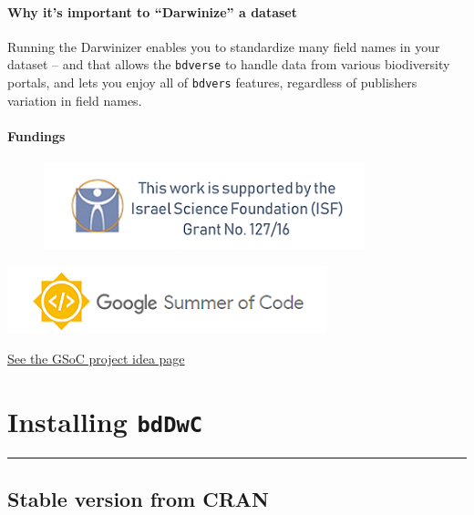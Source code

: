 \documentclass[]{book}
\theoremstyle{definition}
\theoremstyle{definition}
\theoremstyle{definition}
\theoremstyle{remark}
\begin{document}
\subsubsection*{\texorpdfstring{Why it's important to ``Darwinize'' a
dataset}{Why it's important to Darwinize a dataset}}\label{why-its-important-to-darwinize-a-dataset}

Running the Darwinizer enables you to standardize many field names in
your dataset -- and that allows the \texttt{bdverse} to handle data from
various biodiversity portals, and lets you enjoy all of \texttt{bdvers}
features, regardless of publishers variation in field names.

\subsubsection*{Fundings}\label{fundings}

\begin{figure}
\centering
\includegraphics{img/ISF.png}
\caption{}
\end{figure}

\href{https://summerofcode.withgoogle.com/\%20target=\%22_blank\%22}{\includegraphics{img/GSoC.png}}

\href{https://github.com/rstats-gsoc/gsoc2018/wiki/Darwinazing-biodiversity-data-in-R}{See
the GSoC project idea page}

\chapter{\texorpdfstring{Installing
\texttt{bdDwC}}{Installing bdDwC}}\label{installing-bddwc}

\begin{center}\rule{0.5\linewidth}{\linethickness}\end{center}

\section{Stable version from CRAN}\label{stable-version-from-cran}
\end{document}
